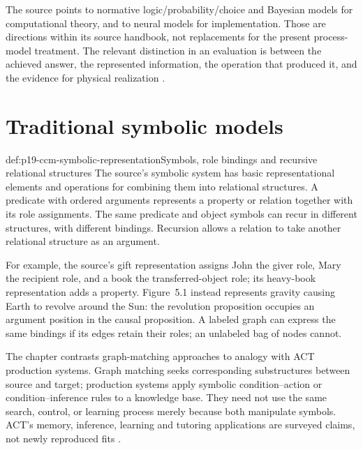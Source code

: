 The source points to normative logic/probability/choice and Bayesian
models for computational theory, and to neural models for implementation.
Those are directions within its source handbook, not replacements for
the present process-model treatment. The relevant distinction in an
evaluation is between the achieved answer, the represented information,
the operation that produced it, and the evidence for physical realization
\parencite[p.~52]{DoumasHummel2012HigherCognition}.

\section{Traditional symbolic models}
\label{sec:p19-ccm-symbolic}

\begin{hbdefinition}{def:p19-ccm-symbolic-representation}{Symbols, role bindings and recursive relational structures}
The source's symbolic system has basic representational elements and
operations for combining them into relational structures. A predicate
with ordered arguments represents a property or relation together with
its role assignments. The same predicate and object symbols can recur
in different structures, with different bindings. Recursion allows a
relation to take another relational structure as an argument.

For example, the source's gift representation assigns John the giver
role, Mary the recipient role, and a book the transferred-object role;
its heavy-book representation adds a property. Figure~5.1 instead
represents gravity causing Earth to revolve around the Sun: the
revolution proposition occupies an argument position in the causal
proposition. A labeled graph can express the same bindings if its edges
retain their roles; an unlabeled bag of nodes cannot.
\end{hbdefinition}

The chapter contrasts graph-matching approaches to analogy with ACT
production systems. Graph matching seeks corresponding substructures
between source and target; production systems apply symbolic
condition--action or condition--inference rules to a knowledge base.
They need not use the same search, control, or learning process merely
because both manipulate symbols. ACT's memory, inference, learning and
tutoring applications are surveyed claims, not newly reproduced fits
\parencite[pp.~52--53]{DoumasHummel2012HigherCognition}.


